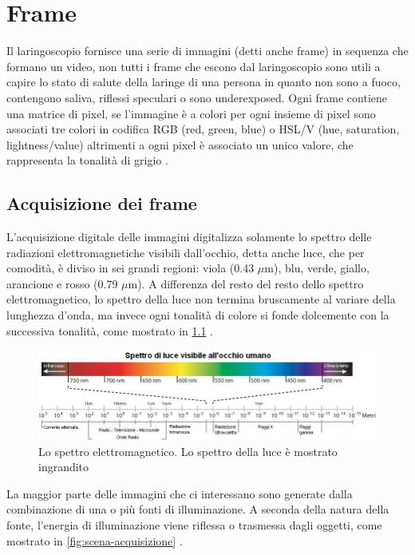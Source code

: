 \chapter{Frame}\label{frame}

Il laringoscopio fornisce una serie di immagini (detti anche frame) in sequenza che formano un video, non tutti i frame che escono dal laringoscopio sono utili a capire lo stato di salute della laringe di una persona in quanto non sono a fuoco, contengono saliva, riflessi speculari o sono underexposed. Ogni frame contiene una matrice di pixel, se l'immagine è a colori per ogni insieme di pixel sono associati tre colori in codifica RGB (red, green, blue) o HSL/V (hue, saturation, lightness/value) altrimenti a ogni pixel è associato un unico valore, che rappresenta la tonalità di grigio \cite{gonzalez_dip}.

\section{Acquisizione dei frame}\label{acquisizione-dei-frame}

L'acquisizione digitale delle immagini digitalizza solamente lo spettro delle radiazioni elettromagnetiche visibili dall'occhio, detta anche luce, che per comodità, è diviso in sei grandi regioni: viola (0.43 \(\mu \)m), blu, verde, giallo, arancione e rosso (0.79 \(\mu \)m). A differenza del resto del resto dello spettro elettromagnetico, lo spettro della luce non termina bruscamente al variare della lunghezza d'onda, ma invece ogni tonalità di colore si fonde dolcemente con
la successiva tonalità, come mostrato in \cref{fig:spettro-onde} \cite{gonzalez_dip}.

\begin{figure}[ht]
    \centering
    \includegraphics[width=1\textwidth]{frame/Spettro-onde.jpg}
    \caption{Lo spettro elettromagnetico. Lo spettro della luce è mostrato ingrandito}
    \label{fig:spettro-onde}
\end{figure}

La maggior parte delle immagini che ci interessano sono generate dalla combinazione di una o più fonti di illuminazione. A seconda della natura della fonte, l'energia di illuminazione viene riflessa o trasmessa dagli oggetti, come mostrato in \cref{fig:scena-acquisizione} \cite{gonzalez_dip}.

